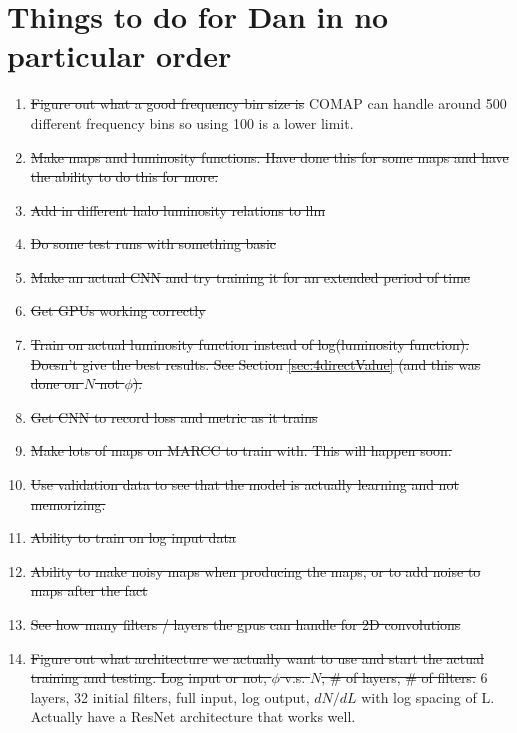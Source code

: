 \documentclass{article}
\begin{document}
	\section{Things to do for Dan in no particular order} \label{sec:todo}
		\begin{enumerate}
			\item \sout{Figure out what a good frequency bin size is}  COMAP can handle around 500 different frequency bins so using 100 is a lower limit.

			\item \sout{Make maps and luminosity functions. Have done this for some maps and have the ability to do this for more.}

			\item \sout{Add in different halo luminosity relations to llm}

			\item \sout{Do some test runs with something basic}

			\item \sout{Make an actual CNN and try training it for an extended period of time}

			\item \sout{Get GPUs working correctly}

			\item \sout{Train on actual luminosity function instead of log(luminosity function). Doesn't give the best results.  See Section \ref{sec:4directValue} (and this was done on \(N\) not \(\phi\)).}

			\item \sout{Get CNN to record loss and metric as it trains}

			\item \sout{Make lots of maps on MARCC to train with.  This will happen soon.}

			\item \sout{Use validation data to see that the model is actually learning and not memorizing.}

			\item \sout{Ability to train on log input data}

			\item \sout{Ability to make noisy maps when producing the maps, or to add noise to maps after the fact}

			\item \sout{See how many filters / layers the gpus can handle for 2D convolutions}

			\item \sout{Figure out what architecture we actually want to use and start the actual training and testing.  Log input or not, \(\phi\) v.s. \(N\), \# of layers, \# of filters.}  6 layers, 32 initial filters, full input, log output, \(dN/dL\) with log spacing of L.  Actually have a ResNet architecture that works well.


\end{enumerate}
\end{document}
